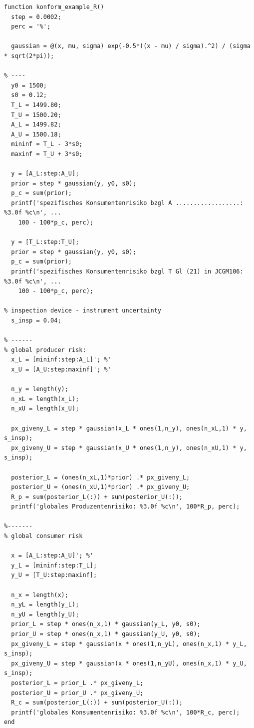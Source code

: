 \begin{lstlisting}[style=Matlab]
  function konform_example_R()
  step = 0.0002;
  perc = '%';

  gaussian = @(x, mu, sigma) exp(-0.5*((x - mu) / sigma).^2) / (sigma * sqrt(2*pi));

% ----
  y0 = 1500;
  s0 = 0.12;
  T_L = 1499.80;
  T_U = 1500.20;
  A_L = 1499.82;
  A_U = 1500.18;
  mininf = T_L - 3*s0;
  maxinf = T_U + 3*s0;

  y = [A_L:step:A_U];
  prior = step * gaussian(y, y0, s0);
  p_c = sum(prior);
  printf('spezifisches Konsumentenrisiko bzgl A ..................: %3.0f %c\n', ...
    100 - 100*p_c, perc);

  y = [T_L:step:T_U];
  prior = step * gaussian(y, y0, s0);
  p_c = sum(prior);
  printf('spezifisches Konsumentenrisiko bzgl T Gl (21) in JCGM106: %3.0f %c\n', ...
    100 - 100*p_c, perc);

% inspection device - instrument uncertainty
  s_insp = 0.04;

% ------
% global producer risk:
  x_L = [mininf:step:A_L]'; %'
  x_U = [A_U:step:maxinf]'; %'

  n_y = length(y);
  n_xL = length(x_L);
  n_xU = length(x_U);

  px_giveny_L = step * gaussian(x_L * ones(1,n_y), ones(n_xL,1) * y, s_insp);
  px_giveny_U = step * gaussian(x_U * ones(1,n_y), ones(n_xU,1) * y, s_insp);

  posterior_L = (ones(n_xL,1)*prior) .* px_giveny_L;
  posterior_U = (ones(n_xU,1)*prior) .* px_giveny_U;
  R_p = sum(posterior_L(:)) + sum(posterior_U(:));
  printf('globales Produzentenrisiko: %3.0f %c\n', 100*R_p, perc);

%-------
% global consumer risk

  x = [A_L:step:A_U]'; %'
  y_L = [mininf:step:T_L];
  y_U = [T_U:step:maxinf];

  n_x = length(x);
  n_yL = length(y_L);
  n_yU = length(y_U);
  prior_L = step * ones(n_x,1) * gaussian(y_L, y0, s0);
  prior_U = step * ones(n_x,1) * gaussian(y_U, y0, s0);
  px_giveny_L = step * gaussian(x * ones(1,n_yL), ones(n_x,1) * y_L, s_insp);
  px_giveny_U = step * gaussian(x * ones(1,n_yU), ones(n_x,1) * y_U, s_insp);
  posterior_L = prior_L .* px_giveny_L;
  posterior_U = prior_U .* px_giveny_U;
  R_c = sum(posterior_L(:)) + sum(posterior_U(:));
  printf('globales Konsumentenrisiko: %3.0f %c\n', 100*R_c, perc);
end

\end{lstlisting}

